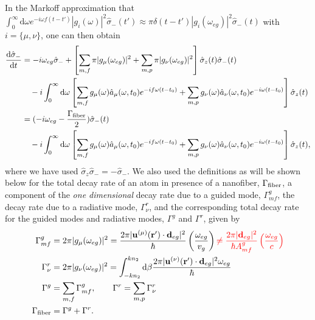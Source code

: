 \documentclass[preprint,aps,pra,onecolumn]{revtex4-1} %
\begin{document}
In the Markoff approximation that $\int_0^\infty \mathrm{d}\omega e^{-i\omega f(t-t')} |g_i(\omega)|^2\hat{\sigma}_-(t')\approx \pi \delta(t-t')|g_i(\omega_{eg})|^2\hat{\sigma}_-(t)$ with $ i=\{\mu,\nu \} $, one can then obtain
\begin{align}
\frac{{\mathrm d} {\hat{\sigma}_-}}{{\mathrm d}t} &= -i\omega_{eg} \hat{\sigma}_- + \left[ \sum_{m,f} \pi |g_\mu(\omega_{eg})|^2 +\sum_{m,p} \pi |g_\nu(\omega_{eg})|^2\right] \hat{\sigma}_z(t)\hat{\sigma}_-(t) \nonumber\\
&\quad - i\int_0^\infty \mathrm{d}\omega \left[ \sum_{m,f} g_\mu(\omega) \hat{a}_\mu(\omega,t_0) e^{-if\omega (t-t_0)}+\sum_{m,p} g_\nu(\omega) \hat{a}_\nu(\omega,t_0) e^{-i\omega (t-t_0)} \right]\hat{\sigma}_z(t)\\
&= (-i\omega_{eg}-\frac{\Gamma_{\rm fiber}}{2})\hat{\sigma}_-(t) \nonumber \\
&\quad -i\int_0^\infty \mathrm{d}\omega \left[ \sum_{m,f} g_\mu(\omega) \hat{a}_\mu(\omega,t_0)e^{-if\omega (t-t_0)}+ \sum_{m,p} g_\nu(\omega) \hat{a}_\nu(\omega,t_0)e^{-i\omega (t-t_0)} \right] \hat{\sigma}_z(t) , \label{eq:dsigma-t}
\end{align}
where we have used $\hat{\sigma}_z\hat{\sigma}_-=-\hat{\sigma}_- $. We also used  the definitions as will be shown below for the total decay rate of an atom in presence of a nanofiber, $\Gamma_{\rm fiber}$, a component of the \textit{one dimensional} decay rate due to a guided mode, $\Gamma^g_{mf} $, the decay rate due to a radiative mode, $\Gamma^r_{\nu} $, and the corresponding total decay rate for the guided modes and radiative modes, $ \Gamma^g $ and $ \Gamma^r $, given by
\begin{align}
\Gamma^g_{mf} &= 2\pi |g_\mu(\omega_{eg})|^2= \frac{2\pi|\mathbf{u}^{(\mu)}(\mathbf{r}')\cdot \mathbf{d}_{eg}|^2}{\hbar }\left( \frac{\omega_{eg}}{v_g}\right) \mathbin{\color{red} \neq \frac{2\pi|\mathbf{d}_{eg}|^2}{\hbar A^g_{mf} }\left( \frac{\omega_{eg}}{c}\right)}\\
\Gamma^r_{\nu} &= 2\pi |g_\nu(\omega_{eg})|^2=\int_{-kn_2}^{kn_2}\mathrm{d}\beta \frac{2\pi|\mathbf{u}^{(\nu)}(\mathbf{r}')\cdot \mathbf{d}_{eg}|^2\omega_{eg}}{\hbar } \\
\Gamma^g &= \sum_{m,f}\Gamma^g_{mf},\quad\quad \Gamma^r = \sum_{m,p}\Gamma^r_{\nu}\\
\Gamma_{\rm fiber} &= \Gamma^g+\Gamma^r. 
\end{align}
\end{document}
